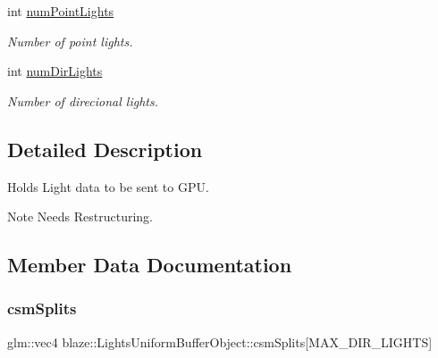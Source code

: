 \begin{DoxyCompactItemize}
\mbox{\label{structblaze_1_1LightsUniformBufferObject_a2bada309c48393d41e2340593e4e7567}} 
int \hyperlink{structblaze_1_1LightsUniformBufferObject_a2bada309c48393d41e2340593e4e7567}{num\+Point\+Lights}
\begin{DoxyCompactList}\small\item\em Number of point lights. \end{DoxyCompactList}\item 
\mbox{\label{structblaze_1_1LightsUniformBufferObject_adcad8a90502fd079b39478b274ef7174}} 
int \hyperlink{structblaze_1_1LightsUniformBufferObject_adcad8a90502fd079b39478b274ef7174}{num\+Dir\+Lights}
\begin{DoxyCompactList}\small\item\em Number of direcional lights. \end{DoxyCompactList}\end{DoxyCompactItemize}


\subsection{Detailed Description}
Holds Light data to be sent to G\+PU. 

\begin{DoxyNote}{Note}
Needs Restructuring. 
\end{DoxyNote}


\subsection{Member Data Documentation}
\mbox{\label{structblaze_1_1LightsUniformBufferObject_a7ec8d8fa3003f1e03e8486064aff2243}} 
\subsubsection{\texorpdfstring{csm\+Splits}{csmSplits}}
{\footnotesize\ttfamily glm\+::vec4 blaze\+::\+Lights\+Uniform\+Buffer\+Object\+::csm\+Splits\mbox{[}M\+A\+X\+\_\+\+D\+I\+R\+\_\+\+L\+I\+G\+H\+TS\mbox{]}}



